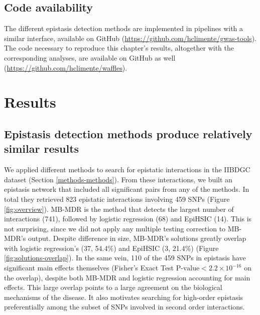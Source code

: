 \documentclass[
  11pt,
]{env/yjiao}
\begin{document}
\hypertarget{code-availability}{%
\subsection{Code availability}\label{code-availability}}

The different epistasis detection methods are implemented in pipelines with a similar interface, available on GitHub (\url{https://github.com/hclimente/gwas-tools}). The code necessary to reproduce this chapter's results, altogether with the corresponding analyses, are available on GitHub as well (\url{https://github.com/hclimente/waffles}).

\hypertarget{results-1}{%
\section{Results}\label{results-1}}

\hypertarget{epistasis-detection-methods-produce-relatively-similar-results}{%
\subsection{Epistasis detection methods produce relatively similar results}\label{epistasis-detection-methods-produce-relatively-similar-results}}

We applied different methods to search for epistatic interactions in the IIBDGC dataset (Section \ref{methods-methods}). From these interactions, we built an epistasis network that included all significant pairs from any of the methods. In total they retrieved 823 epistatic interactions involving 459 SNPs (Figure \ref{fig:overview}). MB-MDR is the method that detects the largest number of interactions (741), followed by logistic regression (68) and EpiHSIC (14). This is not surprising, since we did not apply any multiple testing correction to MB-MDR's output. Despite difference in size, MB-MDR's solutions greatly overlap with logistic regression's (37, 54.4\%) and EpiHSIC (3, 21.4\%) (Figure \ref{fig:solutions-overlap}). In the same vein, 110 of the 459 SNPs in epistasis have significant main effects themselves (Fisher's Exact Test \(\text{P-value} < 2.2 \times 10^{-16}\) on the overlap), despite both MB-MDR and logistic regression accounting for main effects. This large overlap points to a large agreement on the biological mechanisms of the disease. It also motivates searching for high-order epistasis preferentially among the subset of SNPs involved in second order interactions.
\end{document}
